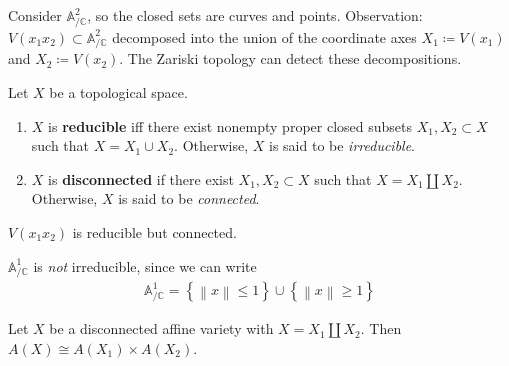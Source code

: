 \begin{example}

Consider \({\mathbb{A}}^2_{/{\mathbb{C}}}\), so the closed sets are
curves and points. Observation:
\(V(x_1 x_2 ) \subset {\mathbb{A}}^2_{/{\mathbb{C}}}\) decomposed into
the union of the coordinate axes \(X_1 \coloneqq V(x_1)\) and
\(X_2 \coloneqq V(x_2)\). The Zariski topology can detect these
decompositions.

\end{example}

\begin{definition}

Let \(X\) be a topological space.

\begin{enumerate}
\def\labelenumi{\alph{enumi}.}
\item
  \(X\) is \textbf{reducible} iff there exist nonempty proper closed
  subsets \(X_1 ,X_2 \subset X\) such that \(X = X_1 \cup X_2\).
  Otherwise, \(X\) is said to be \emph{irreducible}.
\item
  \(X\) is \textbf{disconnected} if there exist \(X_1, X_2 \subset X\)
  such that \(X = X_1 {\coprod}X_2\). Otherwise, \(X\) is said to be
  \emph{connected}.
\end{enumerate}

\end{definition}

\begin{example}

\(V(x_1 x_2)\) is reducible but connected.

\end{example}

\begin{example}

\({\mathbb{A}}^1_{/{\mathbb{C}}}\) is \emph{not} irreducible, since we
can write
\begin{align*}
{\mathbb{A}}^1_{/{\mathbb{C}}} = \left\{{{\left\lVert {x} \right\rVert} \leq 1}\right\} \cup\left\{{{\left\lVert {x} \right\rVert} \geq 1}\right\}
\end{align*}

\end{example}

\begin{proposition}[?]

Let \(X\) be a disconnected affine variety with
\(X = X_1 {\coprod}X_2\). Then \(A(X) \cong A(X_1) \times A(X_2)\).

\end{proposition}


